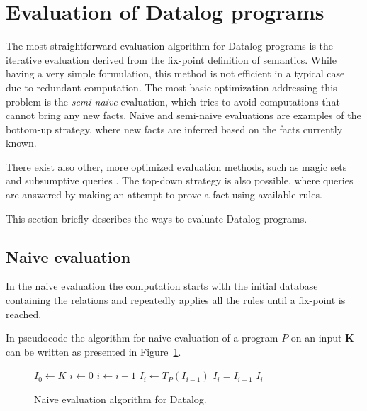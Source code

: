 \section{Evaluation of Datalog programs}
The most straightforward evaluation algorithm for Datalog programs is the iterative evaluation derived from the fix-point definition of semantics. While having a very simple formulation, this method is not efficient in a typical case due to redundant computation. The most basic optimization addressing this problem is the \emph{semi-naive} evaluation, which tries to avoid computations that cannot bring any new facts. Naive and semi-naive evaluations are examples of the bottom-up strategy, where new facts are inferred based on the facts currently known.

There exist also other, more optimized evaluation methods, such as magic sets \cite{magicsets} and subsumptive queries \cite{subsumptivequeries}. The top-down strategy \cite{fod, subsumptivequeries} is also possible, where queries are answered by making an attempt to prove a fact using available rules.

This section briefly describes the ways to evaluate Datalog programs.

\subsection{Naive evaluation}\label{ss:datalognaiveeval}
In the naive evaluation the computation starts with the initial database containing the \edb relations and repeatedly applies all the rules until a fix-point is reached.

In pseudocode the algorithm for naive evaluation of a program $P$ on an input $\textbf{K}$ can be written as presented in Figure~\ref{psc:naiveevaldatalog}.

\begin{figure}[!htbp]
\begin{codebox}
  \li $I_0 \leftarrow K$
  \li $i \leftarrow 0$
  \li \Repeat
  \li $i \leftarrow i + 1$
  \li $I_i \leftarrow T_P(I_{i-1})$
  \li \Until $I_i = I_{i-1}$
  \li \Return $I_i$
\end{codebox}
\caption{Naive evaluation algorithm for Datalog.}\label{psc:naiveevaldatalog}
\end{figure}

